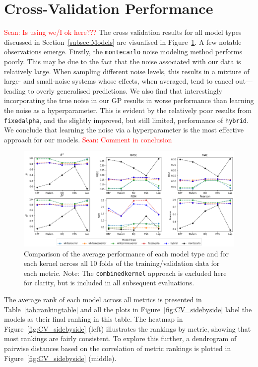 \documentclass{ucdgradtaughtthesis}
\newcommand{\Sean}[1]{{\textcolor{red}{{Sean: #1}} }}
\begin{document}
\section{Cross-Validation Performance}
\Sean{Is using we/I ok here???}
The cross validation results for all model types discussed in Section~\ref{subsec:Models} are visualised in Figure~\ref{fig:broad_comparison}. A few notable observations emerge. Firstly, the \texttt{montecarlo} noise modeling method performs poorly.
This may be due to the fact that the noise associated with our data is relatively large. When sampling different noise levels, this results in a mixture of large- and small-noise systems whose effects, when averaged, tend to cancel out—leading to overly generalised predictions.
We also find that interestingly incorporating the true noise in our GP results in worse performance than learning the noise as a hyperparameter.
This is evident by the relatively poor results from \texttt{fixedalpha}, and the slightly improved, but still limited, performance of \texttt{hybrid}.
We conclude that learning the noise via a hyperparameter is the most effective approach for our models. \Sean{Comment in conclusion}
\begin{figure}[H]
    \centering
    \includegraphics[width=\textwidth]{LatexPlots/CV_plots/metrics_compared.png}
    \caption[Comparing average metrics over all cross validation folds between all model types.]{Comparison of the average performance of each model type and for each kernel across all 10 folds of the training/validation data for each metric. Note: The \texttt{combinedkernel} approach is excluded here for clarity, but is included in all subsequent evaluations.}
    \label{fig:broad_comparison}
\end{figure}
The average rank of each model across all metrics is presented in Table~\ref{tab:rankingtable} and all the plots in Figure~\ref{fig:CV_sidebyside} label the models as their final ranking in this table.
The heatmap in Figure~\ref{fig:CV_sidebyside} (left) illustrates the rankings by metric, showing that most rankings are fairly consistent. To explore this further, a dendrogram of pairwise distances based on the correlation of metric rankings is plotted in Figure~\ref{fig:CV_sidebyside} (middle).
\end{document}
